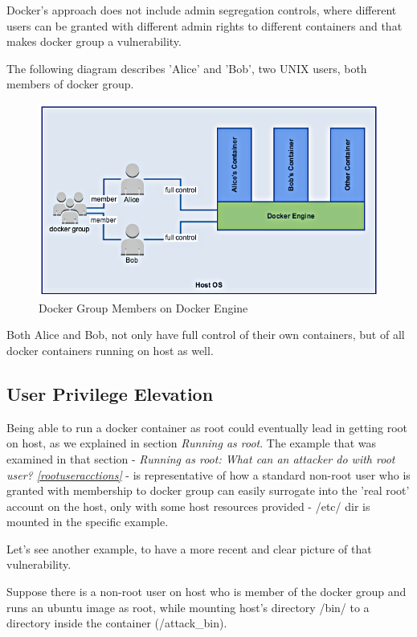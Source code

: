 Docker's approach does not include admin segregation controls, where different users can be granted with different admin rights to different containers and that makes docker group a vulnerability.

The following diagram describes 'Alice' and 'Bob', two UNIX users, both members of docker group.

\begin{figure}[h!]
  \centering
   \includegraphics[width=0.85\linewidth]{../figures/dockergroupgm.png}
   \caption{Docker Group Members on Docker Engine}
\end{figure}

Both Alice and Bob, not only have full control of their own containers, but of all docker containers running on host as well.

\subsection{User Privilege Elevation}
Being able to run a docker container as root could eventually lead in getting root on host, as we explained in section \textit{Running as root}. The example that was examined in that section - \textit{Running as root: What can an attacker do with root user? \ref{rootuseracctions}} - is representative of how a standard non-root user who is granted with membership to docker group can easily surrogate into the 'real root' account on the host, only with some host resources provided - /etc/ dir is mounted in the specific example.

Let's see another example, to have a more recent and clear picture of that vulnerability.

Suppose there is a non-root user on host who is member of the docker group and runs an ubuntu image as root, while mounting host's directory /bin/ to a directory inside the container (/attack\_bin). 

